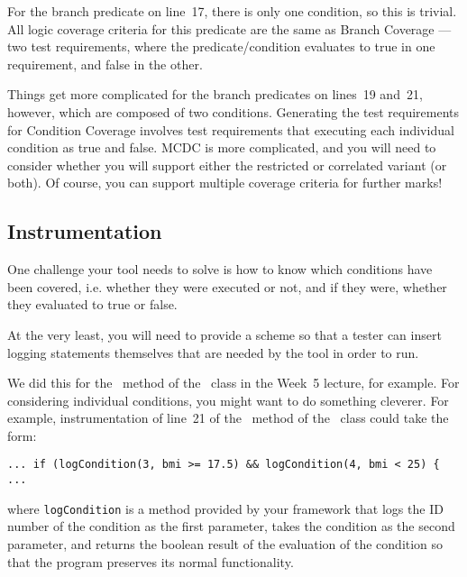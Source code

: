 For the branch predicate on line~17, there is only one condition, so this is
trivial. All logic coverage criteria for this predicate are the same as Branch
Coverage --- two test requirements, where the predicate/condition evaluates to
true in one requirement, and false in the other.

Things get more complicated for the branch predicates on lines~19 and~21,
however, which are composed of two conditions. Generating the test requirements
for Condition Coverage involves test requirements that executing each individual
condition as true and false. MCDC is more complicated, and you will need to
consider whether you will support either the restricted or correlated variant
(or both). Of course, you can support multiple coverage criteria for further
marks! 


\subsection{Instrumentation}

One challenge your tool needs to solve is how to know which conditions have been
covered, i.e. whether they were executed or not, and if they were, whether they
evaluated to true or false. 

At the very least, you will need to provide a scheme so that a tester can insert
logging statements themselves that are needed by the tool in order to run. 

We did this for the \classifymethod~method of the \triangleclass~class in the
Week~5 lecture, for example. For considering individual conditions, you might
want to do something cleverer. For example, instrumentation of line~21 of the
\calculatemethod~method of the \bmicalculatorclass~class could take the form:

\begin{center}
{\tt \scriptsize ... if (logCondition(3, bmi >= 17.5) \&\& logCondition(4, bmi <
25) \{ ...} 
\end{center}

where {\tt logCondition} is a method provided by your framework that logs the ID
number of the condition as the first parameter, takes the condition as the
second parameter, and returns the boolean result of the evaluation of the
condition so that the program preserves its normal functionality. 

